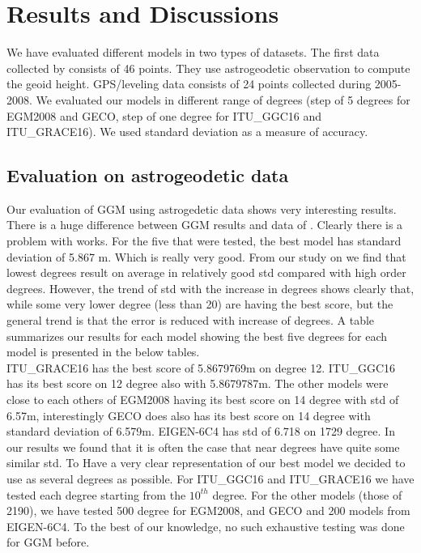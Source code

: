 \chapter{Results and Discussions}
\label{Chapter5}


We have evaluated different models in two types of datasets. The first data collected by \citep{adam} consists of 46 points. They use astrogeodetic observation to compute the geoid height. GPS/leveling data consists of 24 points collected during 2005-2008. We evaluated our models in different range of degrees (step of 5 degrees for EGM2008 and GECO, step of one degree for ITU\_GGC16 and ITU\_GRACE16). We used standard deviation as a measure of accuracy.

\section{Evaluation on astrogeodetic data}

Our evaluation of GGM using astrogedetic data shows very interesting results. There is a huge difference between GGM results and data of \citep{adam}. Clearly there is a problem with \citep{adam} works. For the five that were tested, the best model has standard deviation of 5.867 m. Which is really very good. From our study on \cite{adam} we find that lowest degrees result on average in relatively good std compared with high order degrees. However, the trend of std with the increase in degrees shows clearly that, while some very lower degree (less than 20) are having the best score, but the general trend is that the error is reduced with increase of degrees. A table summarizes our results for each model showing the best five degrees for each model is presented in the below tables. 
\\
ITU\_GRACE16 has the best score of 5.8679769m on degree 12. ITU\_GGC16 has its best score on 12 degree also with 5.8679787m. The other models were close to each others of EGM2008 having its best score on 14 degree with std of 6.57m, interestingly GECO does also has its best score on 14 degree with standard deviation of 6.579m. EIGEN-6C4 has std of 6.718 on 1729 degree. In our results we found that it is often the case that near degrees have quite some similar std. To Have a very clear representation of our best model we decided to use as several degrees as possible. For ITU\_GGC16 and ITU\_GRACE16 we have tested each degree starting from the $10^{th}$ degree. For the other models (those of 2190), we have tested 500 degree for EGM2008, and GECO and 200 models from EIGEN-6C4. To the best of our knowledge, no such exhaustive testing was done for GGM before.

